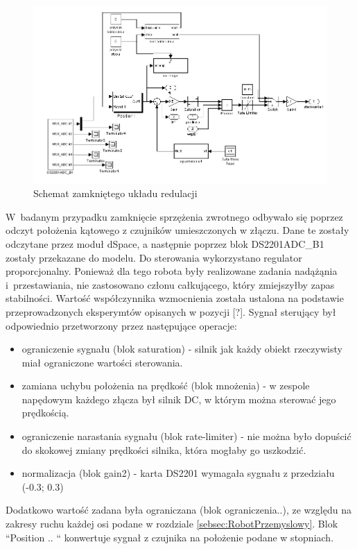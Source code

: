 %
\begin{figure}
\centering
\includegraphics[width=16cm] {dodatki/zamkiety_ukl_reg_wyciete.jpg}
\caption{Schemat zamkniętego układu redulacji}
\label{fig:zamkiety_ukl_reg_wyciete}
\end{figure}

W~badanym przypadku zamknięcie sprzężenia zwrotnego odbywało się poprzez odczyt położenia kątowego z czujników umieszczonych w złączu. Dane te zostały odczytane przez moduł dSpace, a następnie poprzez blok DS2201ADC\_B1 zostały przekazane do modelu. Do sterowania wykorzystano regulator proporcjonalny. Ponieważ dla tego robota były realizowane zadania nadążąnia i~przestawiania, nie zastosowano członu całkującego, który zmiejszyłby zapas stabilności. Wartość współczynnika wzmocnienia została ustalona na podstawie przeprowadzonych eksperymtów opisanych w pozycji [?]. %
Sygnał sterujący był odpowiednio przetworzony przez następujące operacje:
\begin{itemize}
\item ograniczenie sygnału (blok saturation) - silnik jak każdy obiekt rzeczywisty miał ograniczone wartości sterowania.
\item {} zamiana uchybu położenia na prędkość {} (blok mnożenia) - w zespole napędowym każdego złącza był silnik DC, w którym można sterować jego prędkością.
\item ograniczenie narastania sygnału (blok rate-limiter) - nie można było dopuścić do skokowej zmiany prędkości silnika, która mogłaby go uszkodzić.
\item normalizacja (blok gain2) -  karta DS2201 wymagała sygnału z przedziału (-0.3; 0.3)
\end{itemize}
Dodatkowo wartość zadana była ograniczana (blok ograniczenia..), ze względu na zakresy ruchu każdej osi podane w rozdziale \ref{sebsec:RobotPrzemyslowy}.
Blok ``Position .. `` konwertuje sygnał z czujnika na położenie podane w stopniach.

